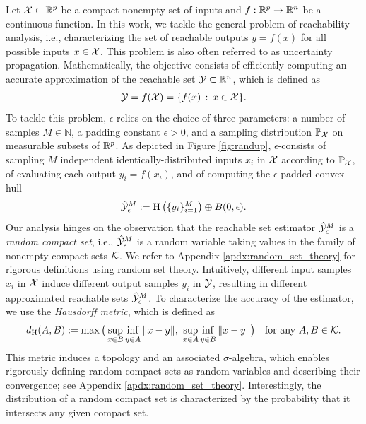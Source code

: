 \documentclass[12pt]{l4dc2022} %
\begin{document}
Let $\mathcal{X}\subset\mathbb{R}^p$ be a compact nonempty set of inputs and  
$f:\mathbb{R}^p\rightarrow\mathbb{R}^n$ be a continuous function. 
% 
In this work, we tackle the general problem of reachability analysis, i.e., %
% 
characterizing the set of reachable outputs $y=f(x)$ for all possible inputs $x\in\mathcal{X}$. 
This problem is also often referred to as uncertainty propagation. %
Mathematically, the objective consists of efficiently computing an accurate approximation of the reachable set $\mathcal{Y}\subset\mathbb{R}^n$, which is defined as 
\begin{align}
\label{eq:reach_set}
\mathcal{Y} = f(\mathcal{X}) =
\{ 
	f(x) \, :\, x\in\mathcal{X}
\}
.
\end{align}
% 
% 
% 
% 
To tackle this problem, 
$\epsilon$-\randup relies on the choice of three parameters: 
a number of samples $M\in\mathbb{N}$, 
a padding constant $\epsilon>0$, 
and 
a sampling distribution $\mathbb{P}_{\mathcal{X}}$ on measurable subsets of $\mathbb{R}^{p}$. 
% 
As depicted in Figure \ref{fig:randup}, %
$\epsilon$-\randup consists of sampling $M$ independent identically-distributed inputs $x_i$ in $\mathcal{X}$ according to $\mathbb{P}_{\mathcal{X}}$, 
of evaluating each output $y_i=f(x_i)$, %
and 
of computing the $\epsilon$-padded convex hull 
\begin{equation}\label{eq:estimator_eps}
\hat{\mathcal{Y}}_\epsilon^M:=\textrm{H}\left(\{y_i\}_{i{=}1}^M\right)\oplus B(0,\epsilon).
\end{equation}
% 
% 
% 
Our analysis hinges on the observation that the reachable set estimator $\hat{\mathcal{Y}}_\epsilon^M$ is a \textit{random compact set}, i.e., $\hat{\mathcal{Y}}_\epsilon^M$ is a random variable taking values in the family of nonempty compact sets $\mathcal{K}$.  
We refer to Appendix \ref{apdx:random_set_theory} for rigorous definitions using random set theory. 
Intuitively, different input samples $x_i$ in $\mathcal{X}$ induce different output samples $y_i$ in $\mathcal{Y}$, resulting in  different approximated reachable sets $\hat{\mathcal{Y}}_\epsilon^M$.  
% 
To characterize the accuracy of
the estimator,
we use the \textit{Hausdorff metric}, which is defined as 
\begin{equation}\label{eq:metric:Hausdorf}
d_\textrm{H}(A,B)
:=
\max\big(
\sup_{x\in B}
\Inf_{y\in A}
\|x-y\|, \
\sup_{x\in A}
\Inf_{y\in B}
\|x-y\|
\big)
\quad
\text{for any $A,B\in\K$.}
\end{equation}
This metric induces a topology and an associated $\sigma$-algebra, which enables 
rigorously defining random compact sets as random variables and  describing their convergence; see Appendix \ref{apdx:random_set_theory}. 
% 
Interestingly, the distribution of a random compact set is characterized by the probability that it intersects any given compact set. 
\end{document}
